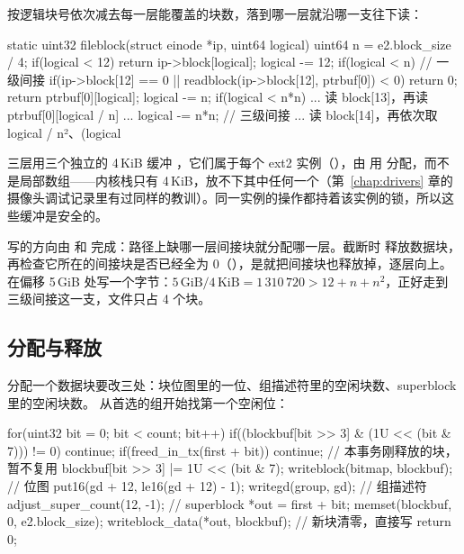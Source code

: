  按逻辑块号依次减去每一层能覆盖的块数，落到哪一层就沿哪一支往下读：

\begin{ccode}
static uint32 fileblock(struct einode *ip, uint64 logical) {
  uint64 n = e2.block_size / 4;
  if(logical < 12) return ip->block[logical];
  logical -= 12;
  if(logical < n){                                          // 一级间接
    if(ip->block[12] == 0 || readblock(ip->block[12], ptrbuf[0]) < 0) return 0;
    return ptrbuf[0][logical];
  }
  logical -= n;
  if(logical < n*n){ ... 读 block[13]，再读 ptrbuf[0][logical / n] ... }
  logical -= n*n;                                           // 三级间接
  ... 读 block[14]，再依次取 logical / n²、(logical %
}
\end{ccode}

三层用三个独立的 4\,KiB 缓冲 ，它们属于每个 ext2 实例（），由  用  分配，而不是局部数组——内核栈只有 4\,KiB，放不下其中任何一个（第~\ref{chap:drivers} 章的摄像头调试记录里有过同样的教训）。同一实例的操作都持着该实例的锁，所以这些缓冲是安全的。

写的方向由  和  完成：路径上缺哪一层间接块就分配哪一层。截断时  释放数据块，再检查它所在的间接块是否已经全为 0（），是就把间接块也释放掉，逐层向上。 在偏移 5\,GiB 处写一个字节：$5\,\text{GiB}/4\,\text{KiB} = 1\,310\,720 > 12 + n + n^2$，正好走到三级间接这一支，文件只占 4 个块。

\subsection{分配与释放}

分配一个数据块要改三处：块位图里的一位、组描述符里的空闲块数、superblock 里的空闲块数。 从首选的组开始找第一个空闲位：

\begin{ccode}
for(uint32 bit = 0; bit < count; bit++){
  if((blockbuf[bit >> 3] & (1U << (bit & 7))) != 0) continue;
  if(freed_in_tx(first + bit)) continue;        // 本事务刚释放的块，暂不复用
  blockbuf[bit >> 3] |= 1U << (bit & 7);
  writeblock(bitmap, blockbuf);                 // 位图
  put16(gd + 12, le16(gd + 12) - 1);
  writegd(group, gd);                           // 组描述符
  adjust_super_count(12, -1);                   // superblock
  *out = first + bit;
  memset(blockbuf, 0, e2.block_size);
  writeblock_data(*out, blockbuf);              // 新块清零，直接写
  return 0;
}
\end{ccode}

